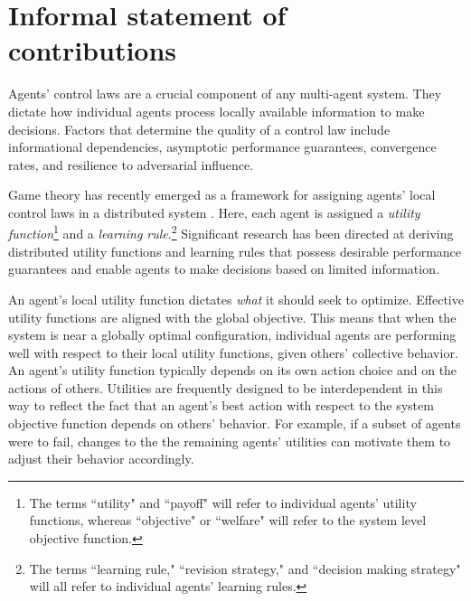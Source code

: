 \section{Informal statement of contributions}

Agents' control laws are a crucial component of any multi-agent system. They dictate how individual agents process locally available information to make decisions. Factors that determine the quality of a control law include informational dependencies, asymptotic performance guarantees, convergence rates, and resilience to adversarial influence.

Game theory has recently emerged as a framework for assigning agents' local control laws in a distributed system \cite{Marden2008, Zhu2009, Goto2010, Staudigle2012, Fox2010, Lasaulce2011, Alpcan2010, Han2012, MacKenzie2006, Menache2011}. Here, each agent is assigned a {\it utility function}\footnote{The terms ``utility" and ``payoff" will refer to individual agents' utility functions, whereas ``objective" or ``welfare" will refer to the system level objective function.} and a {\it learning rule}.\footnote{The terms ``learning rule," ``revision strategy," and ``decision making strategy" will all refer to individual agents' learning rules.} Significant research has been directed at deriving distributed utility functions and learning rules that possess desirable performance guarantees and enable agents to make decisions based on limited information.




An agent's local utility function dictates {\it what} it should seek to optimize. Effective utility functions are aligned with the global objective. This means that when the system is near a globally optimal configuration, individual agents are performing well with respect to their local utility functions, given others' collective behavior.  An agent's utility function typically depends on its own action choice and on the actions of others. Utilities are frequently designed to be interdependent in this way to reflect the fact that an agent's best action with respect to the system objective function depends on others' behavior. For example, if a subset of agents were to fail, changes to the the remaining agents' utilities can motivate them to adjust their behavior accordingly.

